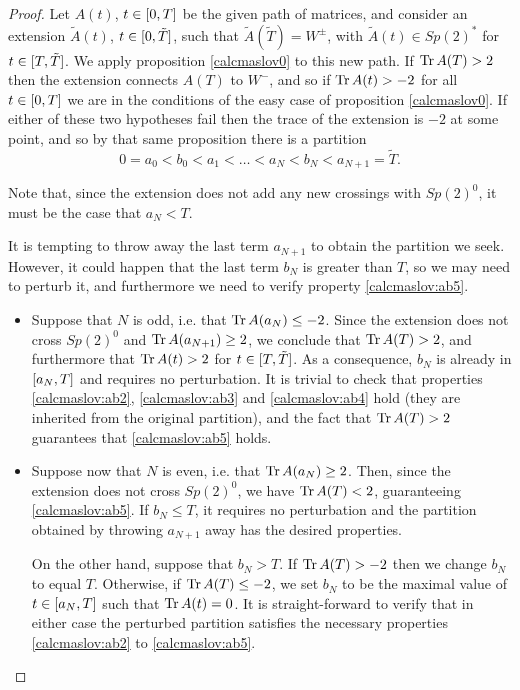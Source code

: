 \begin{proof}
Let $A(t)$, $t \in \interval 0 T$ be the given path of matrices, and consider an extension $\tilde A(t)$, $t \in \interval 0 {\tilde T}$, such that $\tilde A(\tilde T) = W^\pm$, with $\tilde A(t) \in Sp(2)^*$ for $t \in \interval T {\tilde T}$. We apply proposition \ref{calcmaslov0} to this new path. If $\operatorname{Tr} A(T) > 2$ then the extension connects $A(T)$ to $W^-$, and so if $\operatorname{Tr} A(t) > -2$ for all $t \in \interval 0 T$ we are in the conditions of the easy case of proposition \ref{calcmaslov0}. If either of these two hypotheses fail then the trace of the extension is $-2$ at some point, and so by that same proposition there is a partition
\begin{equation}
0 = a_0 < b_0 < a_1 < \dots < a_{N} < b_{N} < a_{N+1} = \tilde T.
\end{equation}

Note that, since the extension does not add any new crossings with $Sp(2)^0$, it must be the case that $a_{N} < T$.

It is tempting to throw away the last term $a_{N+1}$ to obtain the partition we seek. However, it could happen that the last term $b_N$ is greater than $T$, so we may need to perturb it, and furthermore we need to verify property \ref{calcmaslov:ab5}.

\begin{itemize}
\item Suppose that $N$ is odd, i.e. that $\operatorname{Tr} A(a_N) \leq -2$. Since the extension does not cross $Sp(2)^0$ and $\operatorname{Tr} A(a_{N+1}) \geq 2$, we conclude that $\operatorname{Tr} A(T) > 2$, and furthermore that $\operatorname{Tr} A(t) > 2$ for $t \in \interval T {\tilde T}$. As a consequence, $b_N$ is already in $\interval{a_N}T$ and requires no perturbation. It is trivial to check that properties \ref{calcmaslov:ab2}, \ref{calcmaslov:ab3} and \ref{calcmaslov:ab4} hold (they are inherited from the original partition), and the fact that $\operatorname{Tr} A(T) > 2$ guarantees that \ref{calcmaslov:ab5} holds.

\item Suppose now that $N$ is even, i.e. that $\operatorname{Tr} A(a_N) \geq 2$. Then, since the extension does not cross $Sp(2)^0$, we have $\operatorname{Tr} A(T) < 2$, guaranteeing \ref{calcmaslov:ab5}. If $b_N \leq T$, it requires no perturbation and the partition obtained by throwing $a_{N+1}$ away has the desired properties.

On the other hand, suppose that $b_N > T$. If $\operatorname{Tr} A(T) > -2$ then we change $b_N$ to equal $T$. Otherwise, if $\operatorname{Tr} A(T) \leq -2$, we set $b_N$ to be the maximal value of $t \in \interval{a_N}T$ such that $\operatorname{Tr} A(t) = 0$. It is straight-forward to verify that in either case the perturbed partition satisfies the necessary properties \ref{calcmaslov:ab2} to \ref{calcmaslov:ab5}.
\end{itemize}


\end{proof}
